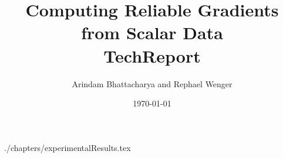 \documentclass[journal]{vgtc}                %
\title{Computing Reliable Gradients from Scalar Data \protect\\ TechReport}
\date{\currenttime \today}
\author{Arindam Bhattacharya and Rephael Wenger}
\begin{document}


\maketitle






 {./chapters/experimentalResults.tex}




\appendix
\newpage


\end{document}
